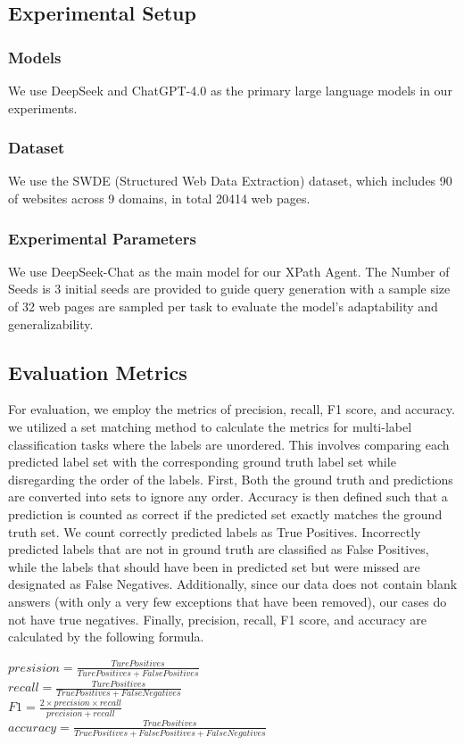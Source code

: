 \documentclass[a4paper]{article}
\begin{document}
\subsection{Experimental Setup}

\subsubsection{Models}
We use DeepSeek and ChatGPT-4.0 as the primary large language models in our experiments.

\subsubsection{Dataset}
We use the SWDE \cite{abdin2024phi3technicalreporthighly} (Structured Web Data Extraction) dataset, which includes 90 of websites across 9 domains, in total 20414 web pages.

\subsubsection{Experimental Parameters}
We use DeepSeek-Chat as the main model for our XPath Agent. The Number of Seeds is 3 initial seeds are provided to guide query generation with a  
sample size of 32 web pages are sampled per task to evaluate the model’s adaptability and generalizability. 

\subsection{Evaluation Metrics}
For evaluation, we employ the metrics of precision, recall, F1 score, and accuracy. we utilized a set matching method to calculate the metrics 
for multi-label classification tasks where the labels are unordered. 
This involves comparing each predicted label set with the corresponding ground truth label set while disregarding the order of the labels. 
First, Both the ground truth and predictions are converted into sets to ignore any order. Accuracy is then defined such that a prediction is 
counted as correct if the predicted set exactly matches the ground truth set. We count correctly predicted labels as True Positives. 
Incorrectly predicted labels that are not in ground truth are classified as False Positives, while the labels that should have been in predicted set 
but were missed are designated as False Negatives. Additionally, since our data does not contain blank answers (with only a very few exceptions that have been removed), 
our cases do not have true negatives. Finally, precision, recall, F1 score, and accuracy are calculated by the following formula.
\begin{center}
$presision=\frac{Ture Positives}{Ture Positives + False Positives}$\\ [0.3 cm]
$recall=\frac{Ture Positives}{True Positives + False Negatives}$\\ [0.3 cm]
$F1=\frac{2 \times precision \times recall}{precision + recall}$\\ [0.3 cm]
$accuracy=\frac{True Positives}{True Positives + False Positives + False Negatives}$
\end{center}
\end{document}
